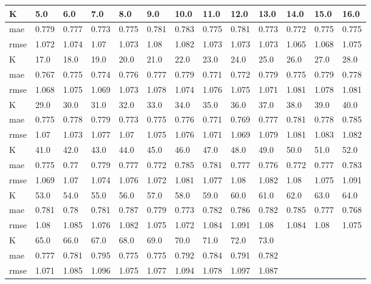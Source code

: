 \begin{appendices}
\begin{center} 
	\begin{tabularx}{\textwidth}{|l|X|X|X|X|X|X|X|X|X|X|X|X|} 
		\hline 
		K & 5.0 & 6.0 & 7.0 & 8.0 & 9.0 & 10.0 & 11.0 & 12.0 & 13.0 & 14.0 & 15.0 & 16.0 \\ \hline 
		mae & 0.779 & 0.777 & 0.773 & 0.775 & 0.781 & 0.783 & 0.775 & 0.781 & 0.773 & 0.772 & 0.775 & 0.775 \\ \hline 
		rmse & 1.072 & 1.074 & 1.07 & 1.073 & 1.08 & 1.082 & 1.073 & 1.073 & 1.073 & 1.065 & 1.068 & 1.075 \\ \hline 
		\hline 
		K & 17.0 & 18.0 & 19.0 & 20.0 & 21.0 & 22.0 & 23.0 & 24.0 & 25.0 & 26.0 & 27.0 & 28.0 \\ \hline 
		mae & 0.767 & 0.775 & 0.774 & 0.776 & 0.777 & 0.779 & 0.771 & 0.772 & 0.779 & 0.775 & 0.779 & 0.778 \\ \hline 
		rmse & 1.068 & 1.075 & 1.069 & 1.073 & 1.078 & 1.074 & 1.076 & 1.075 & 1.071 & 1.081 & 1.078 & 1.081 \\ \hline 
		\hline 
		K & 29.0 & 30.0 & 31.0 & 32.0 & 33.0 & 34.0 & 35.0 & 36.0 & 37.0 & 38.0 & 39.0 & 40.0 \\ \hline 
		mae & 0.775 & 0.778 & 0.779 & 0.773 & 0.775 & 0.776 & 0.771 & 0.769 & 0.777 & 0.781 & 0.778 & 0.785 \\ \hline 
		rmse & 1.07 & 1.073 & 1.077 & 1.07 & 1.075 & 1.076 & 1.071 & 1.069 & 1.079 & 1.081 & 1.083 & 1.082 \\ \hline 
		\hline 
		K & 41.0 & 42.0 & 43.0 & 44.0 & 45.0 & 46.0 & 47.0 & 48.0 & 49.0 & 50.0 & 51.0 & 52.0 \\ \hline 
		mae & 0.775 & 0.77 & 0.779 & 0.777 & 0.772 & 0.785 & 0.781 & 0.777 & 0.776 & 0.772 & 0.777 & 0.783 \\ \hline 
		rmse & 1.069 & 1.07 & 1.074 & 1.076 & 1.072 & 1.081 & 1.077 & 1.08 & 1.082 & 1.08 & 1.075 & 1.091 \\ \hline 
		\hline 
		K & 53.0 & 54.0 & 55.0 & 56.0 & 57.0 & 58.0 & 59.0 & 60.0 & 61.0 & 62.0 & 63.0 & 64.0 \\ \hline 
		mae & 0.781 & 0.78 & 0.781 & 0.787 & 0.779 & 0.773 & 0.782 & 0.786 & 0.782 & 0.785 & 0.777 & 0.768 \\ \hline 
		rmse & 1.08 & 1.085 & 1.076 & 1.082 & 1.075 & 1.072 & 1.084 & 1.091 & 1.08 & 1.084 & 1.08 & 1.075 \\ \hline 
		\hline 
		K & 65.0 & 66.0 & 67.0 & 68.0 & 69.0 & 70.0 & 71.0 & 72.0 & 73.0  & & & \\ \hline 
		mae & 0.777 & 0.781 & 0.795 & 0.775 & 0.775 & 0.792 & 0.784 & 0.791 & 0.782 & & &  \\ \hline 
		rmse & 1.071 & 1.085 & 1.096 & 1.075 & 1.077 & 1.094 & 1.078 & 1.097 & 1.087  & & &  \\ \hline 
	\end{tabularx} 
\end{center}

\end{appendices}
